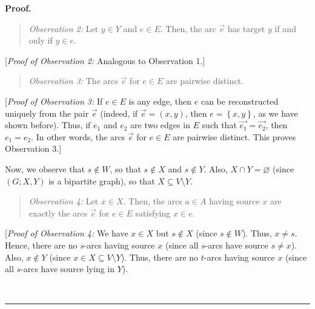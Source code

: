 \documentclass[numbers=enddot,12pt,final,onecolumn,notitlepage]{scrartcl}%
\theoremstyle{definition}
\newenvironment{statement}{\begin{quote}}{\end{quote}}
\newenvironment{proof}[1][Proof]{\noindent\textbf{#1.} }{\ \rule{0.5em}{0.5em}}
\begin{document}
\begin{proof}
\begin{statement}
\textit{Observation 2:} Let $y\in Y$ and $e\in E$. Then, the arc
$\overrightarrow{e}$ has target $y$ if and only if $y\in e$.
\end{statement}

[\textit{Proof of Observation 2:} Analogous to Observation 1.]

\begin{statement}
\textit{Observation 3:} The arcs $\overrightarrow{e}$ for $e\in E$ are
pairwise distinct.
\end{statement}

[\textit{Proof of Observation 3:} If $e\in E$ is any edge, then $e$ can be
reconstructed uniquely from the pair $\overrightarrow{e}$ (indeed, if
$\overrightarrow{e}=\left(  x,y\right)  $, then $e=\left\{  x,y\right\}  $, as
we have shown before). Thus, if $e_{1}$ and $e_{2}$ are two edges in $E$ such
that $\overrightarrow{e_{1}}=\overrightarrow{e_{2}}$, then $e_{1}=e_{2}$. In
other words, the arcs $\overrightarrow{e}$ for $e\in E$ are pairwise distinct.
This proves Observation 3.]

Now, we observe that $s\notin W$, so that $s\notin X$ and $s\notin Y$. Also,
$X\cap Y=\varnothing$ (since $\left(  G;X,Y\right)  $ is a bipartite graph),
so that $X\subseteq V\setminus Y$.

\begin{statement}
\textit{Observation 4:} Let $x\in X$. Then, the arcs $a\in A$ having source
$x$ are exactly the arcs $\overrightarrow{e}$ for $e\in E$ satisfying $x\in e$.
\end{statement}

[\textit{Proof of Observation 4:} We have $x\in X$ but $s\notin X$ (since
$s\notin W$). Thus, $x\neq s$. Hence, there are no $s$-arcs having source $x$
(since all $s$-arcs have source $s\neq x$). Also, $x\notin Y$ (since $x\in
X\subseteq V\setminus Y$). Thus, there are no $t$-arcs having source $x$
(since all $s$-arcs have source lying in $Y$).


\end{proof}
\end{document}
